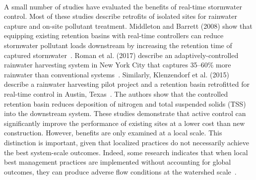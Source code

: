 \

A small number of studies have evaluated the benefits of real-time stormwater control. Most of these studies describe retrofits of isolated sites for rainwater capture and on-site pollutant treatment. Middleton and Barrett (2008) show that equipping existing retention basins with real-time controllers can reduce stormwater pollutant loads downstream by increasing the retention time of captured stormwater~\cite{Middleton_2008}. Roman et al. (2017) describe an adaptively-controlled rainwater harvesting system in New York City that captures 35--60\% more rainwater than conventional systems~\cite{Roman_2017}. Similarly, Klenzendorf et al. (2015) describe a rainwater harvesting pilot project and a retention basin retrofitted for real-time control in Austin, Texas~\cite{Klenzendorf_2015}. The authors show that the controlled retention basin reduces deposition of nitrogen and total suspended solids (TSS) into the downstream system. These studies demonstrate that active control can significantly improve the performance of existing sites at a lower cost than new construction. However, benefits are only examined at a local scale. This distinction is important, given that localized practices do not necessarily achieve the best system-scale outcomes. Indeed, some research indicates that when local best management practices are implemented without accounting for global outcomes, they can produce adverse flow conditions at the watershed scale~\cite{Emerson2005Watershed-ScaleBasins}.


\

